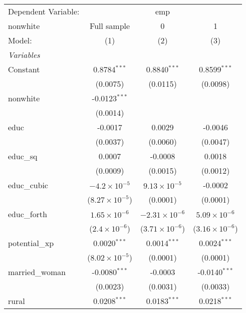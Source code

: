 
\begingroup
\centering
\begin{tabular}{lccc}
   \tabularnewline \midrule \midrule
   Dependent Variable: & \multicolumn{3}{c}{emp}\\
   nonwhite        & Full sample             & 0                       & 1 \\   
   Model:          & (1)                     & (2)                     & (3)\\  
   \midrule
   \emph{Variables}\\
   Constant        & 0.8784$^{***}$          & 0.8840$^{***}$          & 0.8599$^{***}$\\   
                   & (0.0075)                & (0.0115)                & (0.0098)\\   
   nonwhite        & -0.0123$^{***}$         &                         &   \\   
                   & (0.0014)                &                         &   \\   
   educ            & -0.0017                 & 0.0029                  & -0.0046\\   
                   & (0.0037)                & (0.0060)                & (0.0047)\\   
   educ\_sq        & 0.0007                  & -0.0008                 & 0.0018\\   
                   & (0.0009)                & (0.0015)                & (0.0012)\\   
   educ\_cubic     & $-4.2\times 10^{-5}$    & $9.13\times 10^{-5}$    & -0.0002\\   
                   & ($8.27\times 10^{-5}$)  & (0.0001)                & (0.0001)\\   
   educ\_forth     & $1.65\times 10^{-6}$    & $-2.31\times 10^{-6}$   & $5.09\times 10^{-6}$\\    
                   & ($2.4\times 10^{-6}$)   & ($3.71\times 10^{-6}$)  & ($3.16\times 10^{-6}$)\\    
   potential\_xp   & 0.0020$^{***}$          & 0.0014$^{***}$          & 0.0024$^{***}$\\   
                   & ($8.02\times 10^{-5}$)  & (0.0001)                & (0.0001)\\   
   married\_woman  & -0.0080$^{***}$         & -0.0003                 & -0.0140$^{***}$\\   
                   & (0.0023)                & (0.0031)                & (0.0033)\\   
   rural           & 0.0208$^{***}$          & 0.0183$^{***}$          & 0.0218$^{***}$\\   

\end{tabular}
